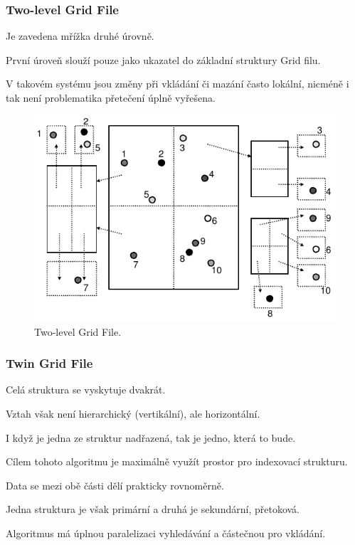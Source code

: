\subsubsection{Two-level Grid File}

\begin{compactitem}
    \item Je zavedena mřížka druhé úrovně. \begin{compactitem}
        \item První úroveň slouží pouze jako ukazatel do základní struktury Grid filu.
    \end{compactitem}

    \item V takovém systému jsou změny při vkládání či mazání často lokální, nicméně i tak není problematika přetečení úplně vyřešena.
\end{compactitem}

\begin{figure}[H]
    \centering
    \includegraphics[width=0.75\linewidth]{grid_file_two_level.pdf}
    \caption{Two-level Grid File.}
\end{figure}

\subsubsection{Twin Grid File}

\begin{compactitem}
    \item Celá struktura se vyskytuje dvakrát. \begin{compactitem}
        \item Vztah však není hierarchický (vertikální), ale horizontální.
        \item I když je jedna ze struktur nadřazená, tak je jedno, která to bude.
    \end{compactitem}
    \item Cílem tohoto algoritmu je maximálně využít prostor pro indexovací strukturu. \begin{compactitem}
        \item Data se mezi obě části dělí prakticky rovnoměrně.
        \item Jedna struktura je však primární a druhá je sekundární, přetoková.
    \end{compactitem}
    \item Algoritmus má úplnou paralelizaci vyhledávání a částečnou pro vkládání.
\end{compactitem}


